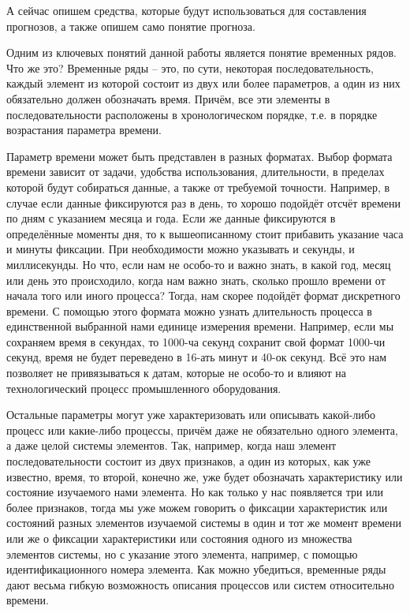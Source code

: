 {\gostFont

  \par \redline А сейчас опишем средства, которые будут использоваться для составления прогнозов, а также опишем само понятие прогноза.

  \par \redline Одним из ключевых понятий данной работы является понятие временных рядов. Что же это? Временные ряды {--} это, по сути, некоторая последовательность, каждый элемент из которой состоит из двух или более параметров, а один из них обязательно должен обозначать время. Причём, все эти элементы в последовательности расположены в хронологическом порядке, т.е. в порядке возрастания параметра времени.

  \par \redline Параметр времени может быть представлен в разных форматах. Выбор формата времени зависит от задачи, удобства использования, длительности, в пределах которой будут собираться данные, а также от требуемой точности. Например, в случае если данные фиксируются раз в день, то хорошо подойдёт отсчёт времени по дням с указанием месяца и года. Если же данные фиксируются в определённые моменты дня, то к вышеописанному стоит прибавить указание часа и минуты фиксации. При необходимости можно указывать и секунды, и миллисекунды. Но что, если нам не особо-то и важно знать, в какой год, месяц или день это происходило, когда нам важно знать, сколько прошло времени от начала того или иного процесса? Тогда, нам скорее подойдёт формат дискретного времени. С помощью этого формата можно узнать длительность процесса в единственной выбранной нами единице измерения времени. Например, если мы сохраняем время в секундах, то 1000-ча секунд сохранит свой формат 1000-чи секунд, время не будет переведено в 16-ать минут и 40-ок секунд. Всё это нам позволяет не привязываться к датам, которые не особо-то и влияют на технологический процесс промышленного оборудования.

  \par \redline Остальные параметры могут уже характеризовать или описывать какой-либо процесс или какие-либо процессы, причём даже не обязательно одного элемента, а даже целой системы элементов. Так, например, когда наш элемент последовательности состоит из двух признаков, а один из которых, как уже известно, время, то второй, конечно же, уже будет обозначать характеристику или состояние изучаемого нами элемента. Но как только у нас появляется три или более признаков, тогда мы уже можем говорить о фиксации характеристик или состояний разных элементов изучаемой системы в один и тот же момент времени или же о фиксации характеристики или состояния одного из множества элементов системы, но с указание этого элемента, например, с помощью идентификационного номера элемента. Как можно убедиться, временные ряды дают весьма гибкую возможность описания процессов или систем относительно времени. 

}
